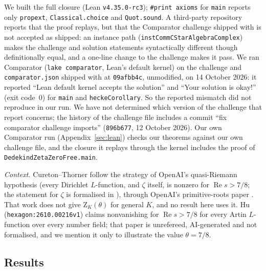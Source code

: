 \documentclass[11pt]{amsart}
\theoremstyle{definition}
\theoremstyle{remark}
\newcommand{\Zt}{\mathrm{Z}}       %
\begin{document}
\begin{enumerate}[label=(I\arabic*),leftmargin=*]
  We built the full closure (Lean \texttt{v4.35.0-rc3}); \texttt{\#print axioms} for \texttt{main} reports only
  \texttt{propext}, \texttt{Classical.choice} and \texttt{Quot.sound}. A third-party repository \cite{Murphy}
  reports that the proof replays, but that the Comparator challenge shipped with \cite{CT-Lean} is not accepted as
  shipped: an instance path (\texttt{instCommCStarAlgebraComplex}) makes the challenge and solution statements
  syntactically different though definitionally equal, and a one-line change to the challenge makes it pass. We ran
  Comparator (\texttt{lake comparator}, Lean's default kernel) on the challenge and \texttt{comparator.json} shipped
  with \cite{CT-Lean} at \texttt{09afbb4c}, unmodified, on 14 October 2026: it reported ``Lean default kernel accepts
  the solution'' and ``Your solution is okay!'' (exit code~0) for \texttt{main} and \texttt{heckeCorollary}. So the
  reported mismatch did not reproduce in our run. We have not determined which version of the challenge that report
  concerns; the history of the challenge file includes a commit ``fix comparator challenge imports''
  (\texttt{896b677}, 12 October 2026). Our own Comparator run (Appendix~\ref{sec:lean}) checks our
  theorems against our own challenge file, and the closure it replays through the kernel includes the proof of
  \texttt{DedekindZetaZeroFree.main}.
\end{enumerate}

\emph{Context.} Cureton--Thorner follow the strategy of OpenAI's quasi-Riemann hypothesis \cite{OAI-QRH} (every
Dirichlet $L$-function, and $\zeta$ itself, is nonzero for $\operatorname{Re}s>7/8$; the statement for $\zeta$ is
formalised in \cite{OAI-Lean}), through OpenAI's primitive-roots paper \cite{OAI-PR}. That work does not give
$\Zt_K(\theta)$ for general $K$, and no result here uses it. Hu \cite{Hu} (\texttt{hexagon:2610.00216v1}) claims
nonvanishing for $\operatorname{Re}s>7/8$ for every Artin $L$-function over every number field; that paper is
unrefereed, AI-generated and not formalised, and we mention it only to illustrate the value $\theta=7/8$.

\subsection{Results}
\end{document}
